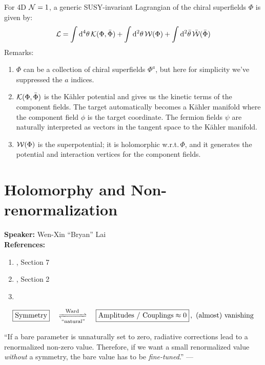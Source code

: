 \documentclass[a4paper
	,10pt
]{article}
\newcommand{\speaker}[1]{\noindent\textbf{Speaker:} #1}
\newcommand{\references}[1]{\noindent\textbf{References:} #1}
\begin{document}
	For 4D $\mathcal{N} = 1$, a generic SUSY-invariant Lagrangian of the chiral superfields $\Phi$ is given by:
	\begin{equation}
		\mathcal{L}
		= \int \dd[4]{\theta} \mathcal{K}(\Phi, \bar{\Phi})
			+ \int \dd[2]{\theta}
				\mathcal{W}(\Phi)
			+ \int \dd[2]{\bar{\theta}}
				\bar{\mathcal{W}}(\bar{\Phi})
	\end{equation}
	Remarks:
	\begin{enumerate}
	\item $\Phi$ can be a collection of chiral superfields $\Phi^a$, but here for simplicity we've suppressed the $a$ indices.
	
	\item $\mathcal{K}(\Phi, \bar{\Phi})$ is the K\"ahler potential and gives us the kinetic terms of the component fields. The target automatically becomes a K\"ahler manifold where the component field $\phi$ is the target coordinate. The fermion fields $\psi$ are naturally interpreted as vectors in the tangent space to the K\"ahler manifold. 
	
	\item $\mathcal{W}(\Phi)$ is the superpotential; it is holomorphic w.r.t.\,$\Phi$, and it generates the potential and interaction vertices for the component fields. 
	\end{enumerate}
\section{Holomorphy and Non-renormalization}
	\speaker{Wen-Xin ``Bryan'' Lai}\\
	\references{
	\begin{enumerate}[noitemsep,topsep=0pt]
	\item \textcite{Argyres:1996abc}, Section 7
	\item \textcite{Intriligator:1995au}, Section 2
	\item \textcite{Seiberg:1993vc}
	\end{enumerate}
	}\vspace{.5\baselineskip}
	
	\begin{equation}
		\boxed{\text{Symmetry}}
		\quad\xrightleftharpoons[
			\text{``natural''}
		]{\text{Ward}}\quad
		\boxed{\text{Amplitudes / Couplings} \approx 0}\,,
		\ \text{(almost) vanishing}
	\end{equation}
	
	``If a bare parameter is unnaturally set to zero, radiative corrections lead to a renormalized non-zero value. Therefore, if we want a small renormalized value \textit{without} a symmetry, the bare value has to be \textit{fine-tuned}.'' --- \textcite{Seiberg:1993vc}
	
\end{document}
